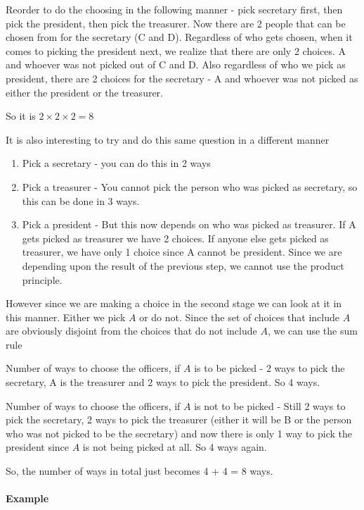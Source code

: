 \documentclass[12pt]{article}
\begin{document}
Reorder to do the choosing in the following manner - pick secretary first, then pick the president, then pick the treasurer. Now there are 2 people that can be chosen from for the secretary (C and D). Regardless of who gets chosen, when it comes to picking the president next, we realize that there are only 2 choices. A and whoever was not picked out of C and D. Also regardless of who we pick as president, there are 2 choices for the secretary - A and whoever was not picked as either the president or the treasurer.

So it is $2 \times 2 \times 2 = 8$

It is also interesting to try and do this same question in a different manner
\begin{enumerate}
\item Pick a secretary - you can do this in 2 ways
\item Pick a treasurer - You cannot pick the person who was picked as secretary, so this can be done in 3 ways.
\item Pick a president - But this now depends on who was picked as treasurer. If A gets picked as treasurer we have 2 choices. If anyone else gets picked as treasurer, we have only 1 choice since A cannot be president. Since we are depending upon the result of the previous step, we cannot use the product principle. 
\end{enumerate}

However since we are making a choice in the second stage we can look at it in this manner. Either we pick $A$ or do not. Since the set of choices that include $A$ are obviously disjoint from the choices that do not include $A$, we can use the sum rule

Number of ways to choose the officers, if $A$ is to be picked - 2 ways to pick the secretary, A is the treasurer and 2 ways to pick the president. So 4 ways. 

Number of ways to choose the officers, if $A$ is not to be picked - Still 2 ways to pick the secretary, 2 ways to pick the treasurer (either it will be B or the person who was not picked to be the secretary) and now there is only 1 way to pick the president since $A$ is not being picked at all. So 4 ways again.

So, the number of ways in total just becomes 4 + 4 = 8 ways.

\paragraph{Example}~\\ 
\end{document}
